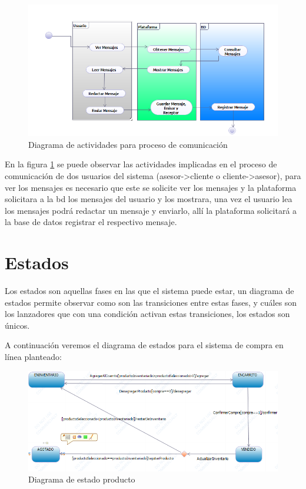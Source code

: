 \begin{figure}[th!]
	\centering
	\includegraphics[width=1\linewidth]{arquitectura/imagenes/workflowMensajes}
	\caption{Diagrama de actividades para proceso de comunicación}
	\label{fig:workflowMensajes}
\end{figure}

En la figura \ref{fig:workflowMensajes} se puede observar las actividades implicadas en el proceso de comunicación de dos usuarios del sistema (asesor->cliente o cliente->asesor), para ver los mensajes es necesario que este se solicite ver los mensajes y la plataforma solicitara a la bd los mensajes del usuario y los mostrara, una vez el usuario lea los mensajes podrá redactar un mensaje y enviarlo, allí la plataforma solicitará a la base de datos registrar el respectivo mensaje.

\newpage

\section{Estados}
Los estados son aquellas fases en las que el sistema puede estar, un diagrama de estados permite observar como son las transiciones entre estas fases, y cuáles son los lanzadores que con una condición activan estas transiciones, los estados son únicos. 

A continuación veremos el diagrama de estados para el sistema de compra en línea planteado:

\begin{figure}[th!]
	\centering
	\includegraphics[width=0.9\linewidth]{arquitectura/imagenes/diagramas_estados}
	\caption{Diagrama de estado producto}
\end{figure}

